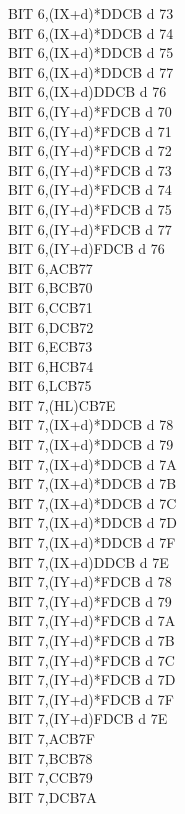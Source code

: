 \documentclass[oneside,a4paper]{book}
\begin{document}
\begin{multicols}{3}
{\begin{tabbing}
BIT 6,(IX+d)*\>DDCB d 73\\
BIT 6,(IX+d)*\>DDCB d 74\\
BIT 6,(IX+d)*\>DDCB d 75\\
BIT 6,(IX+d)*\>DDCB d 77\\
BIT 6,(IX+d)\>DDCB d 76\\
BIT 6,(IY+d)*\>FDCB d 70\\
BIT 6,(IY+d)*\>FDCB d 71\\
BIT 6,(IY+d)*\>FDCB d 72\\
BIT 6,(IY+d)*\>FDCB d 73\\
BIT 6,(IY+d)*\>FDCB d 74\\
BIT 6,(IY+d)*\>FDCB d 75\\
BIT 6,(IY+d)*\>FDCB d 77\\
BIT 6,(IY+d)\>FDCB d 76\\
BIT 6,A\>CB77\\
BIT 6,B\>CB70\\
BIT 6,C\>CB71\\
BIT 6,D\>CB72\\
BIT 6,E\>CB73\\
BIT 6,H\>CB74\\
BIT 6,L\>CB75\\
BIT 7,(HL)\>CB7E\\
BIT 7,(IX+d)*\>DDCB d 78\\
BIT 7,(IX+d)*\>DDCB d 79\\
BIT 7,(IX+d)*\>DDCB d 7A\\
BIT 7,(IX+d)*\>DDCB d 7B\\
BIT 7,(IX+d)*\>DDCB d 7C\\
BIT 7,(IX+d)*\>DDCB d 7D\\
BIT 7,(IX+d)*\>DDCB d 7F\\
BIT 7,(IX+d)\>DDCB d 7E\\
BIT 7,(IY+d)*\>FDCB d 78\\
BIT 7,(IY+d)*\>FDCB d 79\\
BIT 7,(IY+d)*\>FDCB d 7A\\
BIT 7,(IY+d)*\>FDCB d 7B\\
BIT 7,(IY+d)*\>FDCB d 7C\\
BIT 7,(IY+d)*\>FDCB d 7D\\
BIT 7,(IY+d)*\>FDCB d 7F\\
BIT 7,(IY+d)\>FDCB d 7E\\
BIT 7,A\>CB7F\\
BIT 7,B\>CB78\\
BIT 7,C\>CB79\\
BIT 7,D\>CB7A\\

\end{tabbing}}
\end{multicols}
\end{document}
